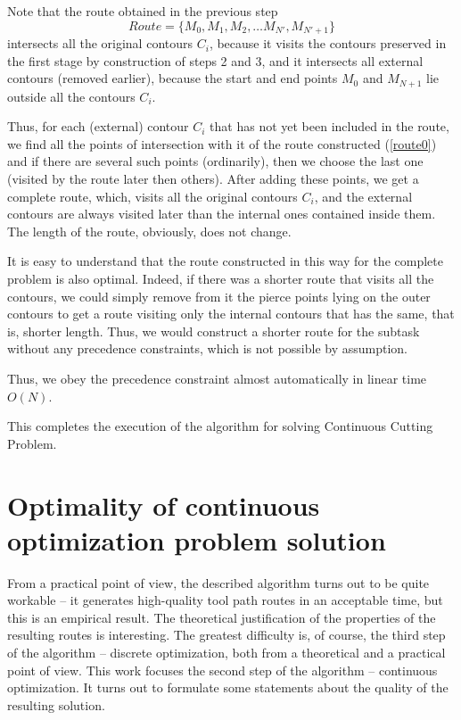 \documentclass[]{interact}
\theoremstyle{plain}%
\theoremstyle{definition}
\theoremstyle{remark}
\begin{document}
Note that the route obtained in the previous step
\begin{equation}
Route = \{ M_0, M_1, M_2, \dots M_{N'}, M_{N'+1}\}
\label{route0}
\end{equation}
intersects all the original contours
$C_i$,
because it visits the contours preserved in the first stage
by construction of steps 2 and 3,
and it intersects all external contours
(removed earlier),
because the start and end points
$M_0$ and
$M_{N + 1}$
lie outside all the contours
$C_i$.

Thus,
for each (external) contour
$C_i$
that has not yet been included in the route,
we find all the points of intersection
with it of the route constructed
(\ref{route0})
and if there are several such points (ordinarily),
then we choose the last one
(visited by the route later then others).
After adding these points,
we get a complete route,
which,
visits all the original contours
$C_i$,
and the external contours are always visited later than
the internal ones contained inside them.
The length of the route, obviously, does not change.

It is easy to understand
that the route constructed in this way
for the complete problem
is also optimal.
Indeed,
if there was a shorter route
that visits all the contours,
we could simply remove from it
the pierce points
lying on the outer contours to get a route
visiting only the internal contours
that has the same, that is, shorter length.
Thus, we would construct a shorter route
for the subtask without any precedence constraints,
which is not possible by assumption.

Thus,
we obey the precedence constraint
almost automatically in linear time
$O(N)$.

This completes the execution of the algorithm
for solving Continuous Cutting Problem.

\section{Optimality of continuous optimization problem solution}

From a practical point of view,
the described algorithm turns out to be quite workable --
it generates high-quality tool path routes in an acceptable time,
but this is an empirical result.
The theoretical justification of the properties
of the resulting routes is interesting.
The greatest difficulty is, of course,
the third step of the algorithm --
discrete optimization,
both from a theoretical and a
practical point of view.
This work focuses the second step of the algorithm --
continuous optimization.
It turns out to formulate some statements
about the quality of the resulting solution.
\end{document}
